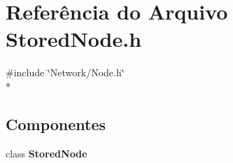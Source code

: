 \section{Referência do Arquivo Stored\+Node.\+h}
\label{_stored_node_8h}
{\ttfamily \#include \char`\"{}Network/\+Node.\+h\char`\"{}}\\*
\subsection*{Componentes}
\begin{DoxyCompactItemize}
\item 
class {\bf Stored\+Node}
\end{DoxyCompactItemize}
